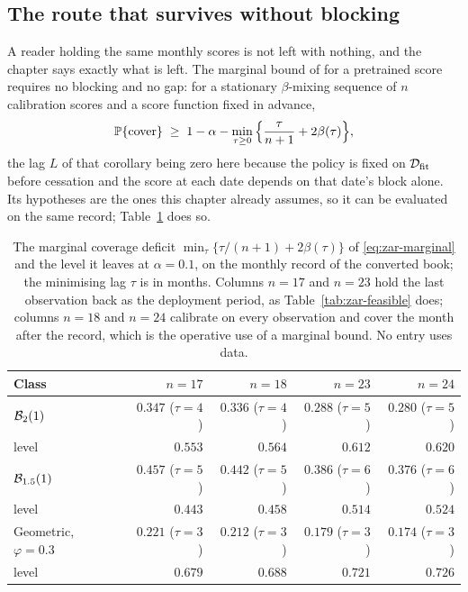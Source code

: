 \documentclass[../../../main.tex]{subfiles}
\begin{document}
\subsection{The route that survives without blocking}\label{sec:zar-marginal}

A reader holding the same monthly scores is not left with nothing, and the chapter says exactly what is left. The marginal bound of \citet[Cor.~1, eq.~(6)]{barber2026} for a pretrained score requires no blocking and no gap: for a stationary $\beta$-mixing sequence of $n$ calibration scores and a score function fixed in advance,
\begin{equation}\label{eq:zar-marginal}
\mathbb{P}\{\text{cover}\}\;\ge\;1-\alpha-\min_{\tau\ge0}\Big\{\frac{\tau}{n+1}+2\beta(\tau)\Big\},
\end{equation}
the lag $L$ of that corollary being zero here because the policy is fixed on $\mathcal D_{\mathrm{fit}}$ before cessation and the score at each date depends on that date's block alone. Its hypotheses are the ones this chapter already assumes, so it can be evaluated on the same record; Table~\ref{tab:zar-marginal} does so.

\begin{table}[htbp]\centering\small
\caption{The marginal coverage deficit $\min_\tau\{\tau/(n+1)+2\beta(\tau)\}$ of \eqref{eq:zar-marginal} and the level it leaves at $\alpha=0.1$, on the monthly record of the converted book; the minimising lag $\tau$ is in months. Columns $n=17$ and $n=23$ hold the last observation back as the deployment period, as Table~\ref{tab:zar-feasible} does; columns $n=18$ and $n=24$ calibrate on every observation and cover the month after the record, which is the operative use of a marginal bound. No entry uses data.}\label{tab:zar-marginal}
\begin{tabular}{@{}lrrrr@{}}
\toprule
Class & $n=17$ & $n=18$ & $n=23$ & $n=24$ \\
\midrule
$\mathcal B_{2}(1)$ & $0.347$ ($\tau=4$) & $0.336$ ($\tau=4$) & $0.288$ ($\tau=5$) & $0.280$ ($\tau=5$) \\
level & $0.553$ & $0.564$ & $0.612$ & $0.620$ \\
$\mathcal B_{1.5}(1)$ & $0.457$ ($\tau=5$) & $0.442$ ($\tau=5$) & $0.386$ ($\tau=6$) & $0.376$ ($\tau=6$) \\
level & $0.443$ & $0.458$ & $0.514$ & $0.524$ \\
Geometric, $\varphi=0.3$ & $0.221$ ($\tau=3$) & $0.212$ ($\tau=3$) & $0.179$ ($\tau=3$) & $0.174$ ($\tau=3$) \\
level & $0.679$ & $0.688$ & $0.721$ & $0.726$ \\
\bottomrule
\end{tabular}
\end{table}
\end{document}
